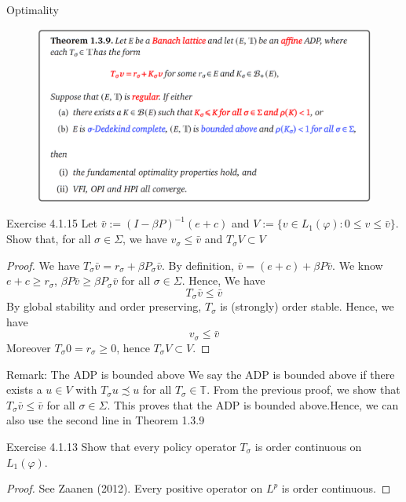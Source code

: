 \begin{frame}{Optimality}
\begin{figure}
    \centering
    \includegraphics[width=0.9\linewidth]{Dynamic Programming/DP2/Chapter 4/Section 4.1.1. Job Search/thm139new.png}
\end{figure}
\end{frame}

\begin{frame}{Exercise 4.1.15}
Let $\bar v:= (I-\beta P)^{-1}(e+c)$ and $V:= \{v\in L_1(\varphi): 0\le v\le \bar v\}$. Show that, for all $\sigma \in\Sigma$, we have $v_\sigma \le \bar v$ and $T_\sigma V\subset V$ 
\begin{proof}
    We have $T_\sigma \bar v = r_\sigma +\beta P_\sigma \bar v$. By definition, $\bar v = (e+c) + \beta P\bar v$. We know $e+c\ge r_\sigma$, $\beta P\bar v\ge \beta P_\sigma \bar v$ for all $\sigma\in\Sigma$. Hence, We have
    $$
    T_\sigma \bar v\le \bar v
    $$
    By global stability and order preserving, $T_\sigma$ is (strongly) order stable. Hence, we have
    $$
    v_\sigma \le \bar v
    $$
    Moreover $T_\sigma 0 = r_\sigma \ge 0$, hence $T_\sigma V\subset V$.
\end{proof}
\end{frame}
\begin{frame}{Remark: The ADP is bounded above}
We say the ADP is bounded above if there exists a $u\in V$ with $T_\sigma u\precsim u$ for all $T_\sigma\in\mathbb{T}$. From the previous proof, we show that $T_\sigma \bar v\le \bar v$ for all $\sigma \in \Sigma$. This proves that the ADP is bounded above.Hence, we can also use the second line in Theorem 1.3.9
\end{frame}

\begin{frame}{Exercise 4.1.13}
    Show that every policy operator $T_\sigma$ is order continuous on $L_1(\varphi)$.
    \begin{proof}
        See Zaanen (2012). Every positive operator on $L^p$ is order continuous. 
    \end{proof}
\end{frame}

